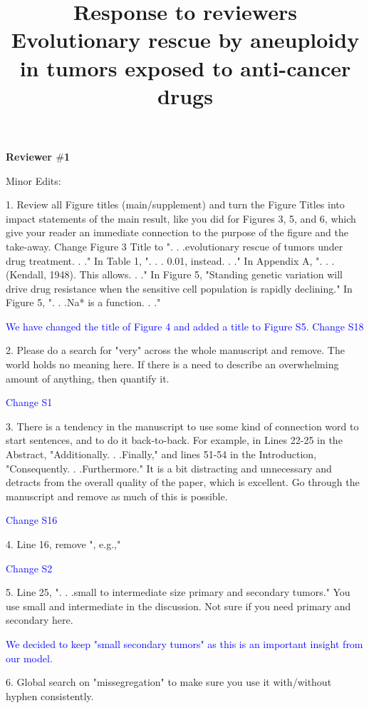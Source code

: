 \documentclass[12pt]{extarticle}
\title{
	Response to reviewers\\ Evolutionary rescue by aneuploidy in tumors exposed to anti-cancer drugs 
}
\begin{document}
\maketitle

\textbf{Reviewer $\#$1}

Minor Edits:

1. Review all Figure titles (main/supplement) and turn the Figure Titles into impact statements of the main result, like you did for Figures 3, 5, and 6, which give your reader an immediate connection to the purpose of the figure and the take-away. Change Figure 3 Title to ". . .evolutionary rescue of tumors under drug treatment. . ." In Table 1, ". . . 0.01, instead. . ." In Appendix A, ". . .(Kendall, 1948). This allows. . ." In Figure 5, "Standing genetic variation will drive drug resistance when the sensitive cell population is rapidly declining." In Figure 5, ". . .Na* is a function. . ."

\textcolor{blue}{We have changed the title of Figure 4 and added a title to Figure S5. Change S18}

2. Please do a search for "very" across the whole manuscript and remove. The world holds no meaning here. If there is a need to describe an overwhelming amount of anything, then quantify it. 

\textcolor{blue}{Change S1}

3. There is a tendency in the manuscript to use some kind of connection word to start sentences, and to do it back-to-back. For example, in Lines 22-25 in the Abstract, "Additionally. . .Finally," and lines 51-54 in the Introduction, "Consequently. . .Furthermore." It is a bit distracting and unnecessary and detracts from the overall quality of the paper, which is excellent. Go through the manuscript and remove as much of this is possible.

\textcolor{blue}{Change S16}

4. Line 16, remove ", e.g.,"

\textcolor{blue}{Change S2}

5. Line 25, ". . .small to intermediate size primary and secondary tumors." You use small and intermediate in the discussion. Not sure if you need primary and secondary here.

\textcolor{blue}{We decided to keep "small secondary tumors" as this is an important insight from our model.} 

6. Global search on "missegregation" to make sure you use it with/without hyphen consistently.
\end{document}
